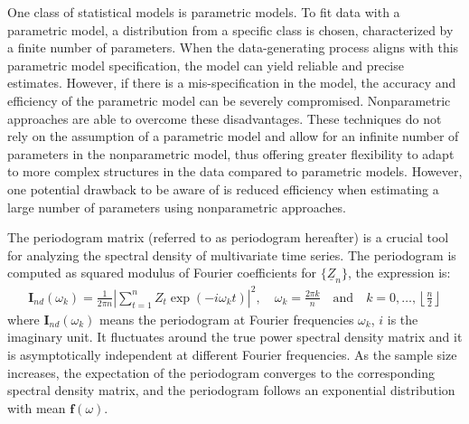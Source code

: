 \documentclass[12pt,a4paper]{article}
\begin{document}
One class of statistical models is parametric models. To fit data with a parametric model, a distribution from a specific class is chosen, characterized by a finite number of parameters. When the data-generating process aligns with this parametric model specification, the model can yield reliable and precise estimates. However, if there is a mis-specification in the model, the accuracy and efficiency of the parametric model can be severely compromised. Nonparametric approaches are able to overcome these disadvantages. These techniques do not rely on the assumption of a parametric model and allow for an infinite number of parameters in the nonparametric model, thus offering greater flexibility to adapt to more complex structures in the data compared to parametric models. However, one potential drawback to be aware of is reduced efficiency when estimating a large number of parameters using nonparametric approaches.

The periodogram matrix (referred to as periodogram hereafter) is a crucial tool for analyzing the spectral density of multivariate time series. 
The periodogram is computed as squared modulus of Fourier coefficients for $\{\underline Z_{n}\}$, the expression is:
\begin{align*}
\bm{I}_{nd}(\omega_k) = \frac{1}{2\pi n} \left| \sum_{t=1}^{n} {Z}_t \exp(-i\omega_kt) \right|^2,
\quad \omega_k = \frac{2\pi k}{n} \quad \text{and} \quad k = 0, \ldots, \left\lfloor \frac{n}{2} \right\rfloor
\end{align*}
where $\bm{I}_{nd}(\omega_k)$ means the periodogram at Fourier frequencies $\omega_k$, $i$ is the imaginary unit.
It fluctuates around the true power spectral density matrix and it is asymptotically independent at different Fourier frequencies. As the sample size increases, the expectation of the periodogram converges to the corresponding spectral density matrix, and the periodogram follows an exponential distribution with mean $\bm{f}(\omega)$.
\end{document}
